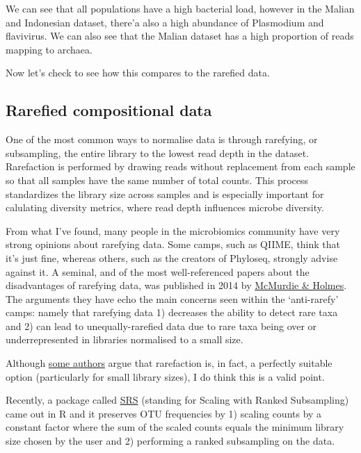 \documentclass[]{article}
\begin{document}
We can see that all populations have a high bacterial load, however in
the Malian and Indonesian dataset, there'a also a high abundance of
Plasmodium and flavivirus. We can also see that the Malian dataset has a
high proportion of reads mapping to archaea.

Now let's check to see how this compares to the rarefied data.

\hypertarget{rarefied-compositional-data}{%
\subsection{Rarefied compositional
data}\label{rarefied-compositional-data}}

One of the most common ways to normalise data is through rarefying, or
subsampling, the entire library to the lowest read depth in the dataset.
Rarefaction is performed by drawing reads without replacement from each
sample so that all samples have the same number of total counts. This
process standardizes the library size across samples and is especially
important for calulating diversity metrics, where read depth influences
microbe diversity.

From what I've found, many people in the microbiomics community have
very strong opinions about rarefying data. Some camps, such as QIIME,
think that it's just fine, whereas others, such as the creators of
Phyloseq, strongly advise against it. A seminal, and of the most
well-referenced papers about the disadvantages of rarefying data, was
published in 2014 by
\href{https://journals.plos.org/ploscompbiol/article?id=10.1371/journal.pcbi.1003531}{McMurdie
\& Holmes}. The arguments they have echo the main concerns seen within
the `anti-rarefy' camps: namely that rarefying data 1) decreases the
ability to detect rare taxa and 2) can lead to unequally-rarefied data
due to rare taxa being over or underrepresented in libraries normalised
to a small size.

Although
\href{https://www.ncbi.nlm.nih.gov/pmc/articles/PMC5335496/}{some
authors} argue that rarefaction is, in fact, a perfectly suitable option
(particularly for small library sizes), I do think this is a valid
point.

Recently, a package called \href{https://peerj.com/articles/9593/}{SRS}
(standing for Scaling with Ranked Subsampling) came out in R and it
preserves OTU frequencies by 1) scaling counts by a constant factor
where the sum of the scaled counts equals the minimum library size
chosen by the user and 2) performing a ranked subsampling on the data.
\end{document}
